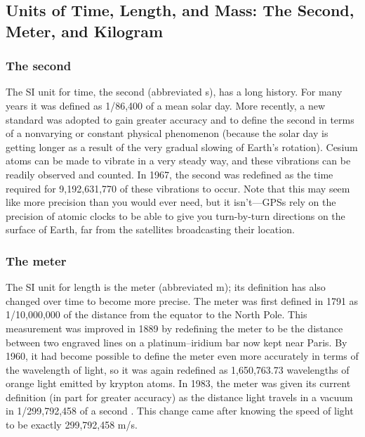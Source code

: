 \documentclass{report}
\begin{document}
    \pagebreak 
    \subsection{Units of Time, Length, and Mass: The Second, Meter, and Kilogram}
    \bigbreak \noindent 
    \subsubsection{The second}
    \bigbreak \noindent 
    The SI unit for time, the second (abbreviated s), has a long history. For many years it was defined as 1/86,400 of a mean solar day. More recently, a new standard was adopted to gain greater accuracy and to define the second in terms of a nonvarying or constant physical phenomenon (because the solar day is getting longer as a result of the very gradual slowing of Earth’s rotation). Cesium atoms can be made to vibrate in a very steady way, and these vibrations can be readily observed and counted. In 1967, the second was redefined as the time required for 9,192,631,770 of these vibrations to occur. Note that this may seem like more precision than you would ever need, but it isn’t—GPSs rely on the precision of atomic clocks to be able to give you turn-by-turn directions on the surface of Earth, far from the satellites broadcasting their location.
    \bigbreak \noindent 
    \subsubsection{The meter}
    \bigbreak \noindent 
    The SI unit for length is the meter (abbreviated m); its definition has also changed over time to become more precise. The meter was first defined in 1791 as 1/10,000,000 of the distance from the equator to the North Pole. This measurement was improved in 1889 by redefining the meter to be the distance between two engraved lines on a platinum–iridium bar now kept near Paris. By 1960, it had become possible to define the meter even more accurately in terms of the wavelength of light, so it was again redefined as 1,650,763.73 wavelengths of orange light emitted by krypton atoms. In 1983, the meter was given its current definition (in part for greater accuracy) as the distance light travels in a vacuum in 1/299,792,458 of a second . This change came after knowing the speed of light to be exactly 299,792,458 m/s.
    \bigbreak \noindent 
\end{document}
